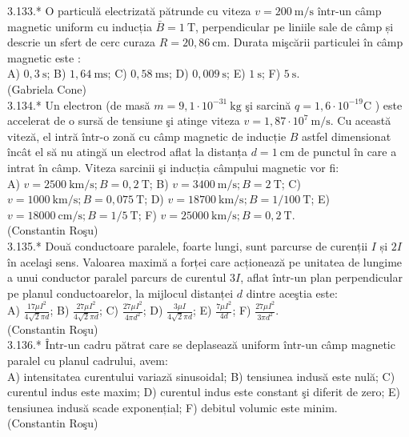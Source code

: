 3.133.* O particulă electrizată pătrunde cu viteza $v=200 \mathrm{~m} / \mathrm{s}$ într-un câmp magnetic uniform cu inducția $\bar{B}=1 \mathrm{~T}$, perpendicular pe liniile sale de câmp și descrie un sfert de cerc curaza $R=20,86 \mathrm{~cm}$. Durata mişcării particulei în câmp magnetic este :\\ A) $0,3 \mathrm{~s}$; B) $1,64 \mathrm{~ms}$; C) $0,58 \mathrm{~ms}$; D) $0,009 \mathrm{~s}$; E) $1 \mathrm{~s}$; F) $5 \mathrm{~s}$.\\ (Gabriela Cone)\\

3.134.* Un electron (de masă $m=9,1 \cdot 10^{-31} \mathrm{~kg}$ şi sarcină $q=1,6 \cdot 10^{-19} \mathrm{C}$ ) este accelerat de o sursă de tensiune şi atinge viteza $v=1,87 \cdot 10^{7} \mathrm{~m} / \mathrm{s}$. Cu această viteză, el intră într-o zonă cu câmp magnetic de inducție $B$ astfel dimensionat încât el să nu atingă un electrod aflat la distanța $d=1 \mathrm{~cm}$ de punctul în care a intrat în câmp. Viteza sarcinii şi inducția câmpului magnetic vor fi:\\ A) $v=2500 \mathrm{~km} / \mathrm{s} ; B=0,2 \mathrm{~T}$; B) $v=3400 \mathrm{~m} / \mathrm{s} ; B=2 \mathrm{~T}$; C) $v=1000 \mathrm{~km} / \mathrm{s} ; B=0,075 \mathrm{~T}$; D) $v=18700 \mathrm{~km} / \mathrm{s} ; B=1 / 100 \mathrm{~T}$; E) $v=18000 \mathrm{~cm} / \mathrm{s} ; B=1 / 5 \mathrm{~T}$; F) $v=25000 \mathrm{~km} / \mathrm{s} ; B=0,2 \mathrm{~T}$.\\ (Constantin Roşu)\\

3.135.* Două conductoare paralele, foarte lungi, sunt parcurse de curenții $I$ și $2 I$ în acelaşi sens. Valoarea maximă a forței care acționează pe unitatea de lungime a unui conductor paralel parcurs de curentul $3 I$, aflat într-un plan perpendicular pe planul conductoarelor, la mijlocul distanței $d$ dintre aceştia este:\\ A) $\frac{17 \mu I^{2}}{4 \sqrt{2} \pi d}$; B) $\frac{27 \mu I^{2}}{4 \sqrt{2} \pi d}$; C) $\frac{27 \mu I^{2}}{4 \pi d^{2}}$; D) $\frac{3 \mu I}{4 \sqrt{2} \pi d}$; E) $\frac{7 \mu I^{2}}{4 d}$; F) $\frac{27 \mu I^{2}}{3 \pi d^{2}}$.\\ (Constantin Roşu)\\

3.136.* Într-un cadru pătrat care se deplasează uniform într-un câmp magnetic paralel cu planul cadrului, avem:\\ A) intensitatea curentului variază sinusoidal; B) tensiunea indusă este nulă; C) curentul indus este maxim; D) curentul indus este constant şi diferit de zero; E) tensiunea indusă scade exponențial; F) debitul volumic este minim.\\ (Constantin Roşu)\\

